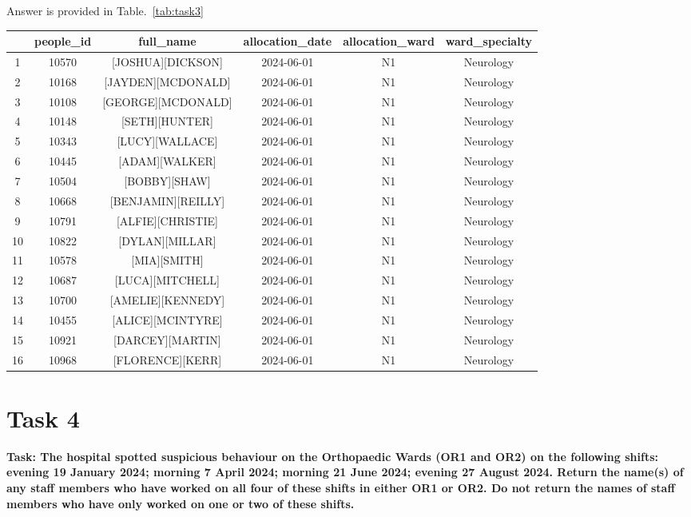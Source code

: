 \documentclass{article}
\begin{document}
Answer is provided in Table.~\ref{tab:task3}

\begin{sidewaystable}[h]
\centering
\small
\begin{tabular}{|c|c|c|c|c|c|}
\hline & people\_id & full\_name & allocation\_date & allocation\_ward & ward\_specialty \\
\hline 1 & 10570 & [JOSHUA][DICKSON] & 2024-06-01 & N1 & Neurology \\
\hline 2 & 10168 & [JAYDEN][MCDONALD] & 2024-06-01 & N1 & Neurology \\
\hline 3 & 10108 & [GEORGE][MCDONALD] & 2024-06-01 & N1 & Neurology \\
\hline 4 & 10148 & [SETH][HUNTER] & 2024-06-01 & N1 & Neurology \\
\hline 5 & 10343 & [LUCY][WALLACE] & 2024-06-01 & N1 & Neurology \\
\hline 6 & 10445 & [ADAM][WALKER] & 2024-06-01 & N1 & Neurology \\
\hline 7 & 10504 & [BOBBY][SHAW] & 2024-06-01 & N1 & Neurology \\
\hline 8 & 10668 & [BENJAMIN][REILLY] & 2024-06-01 & N1 & Neurology \\
\hline 9 & 10791 & [ALFIE][CHRISTIE] & 2024-06-01 & N1 & Neurology \\
\hline 10 & 10822 & [DYLAN][MILLAR] & 2024-06-01 & N1 & Neurology \\
\hline 11 & 10578 & [MIA][SMITH] & 2024-06-01 & N1 & Neurology \\
\hline 12 & 10687 & [LUCA][MITCHELL] & 2024-06-01 & N1 & Neurology \\
\hline 13 & 10700 & [AMELIE][KENNEDY] & 2024-06-01 & N1 & Neurology \\
\hline 14 & 10455 & [ALICE][MCINTYRE] & 2024-06-01 & N1 & Neurology \\
\hline 15 & 10921 & [DARCEY][MARTIN] & 2024-06-01 & N1 & Neurology \\
\hline 16 & 10968 & [FLORENCE][KERR] & 2024-06-01 & N1 & Neurology \\
\hline
\end{tabular}
   \caption{List of staff members who were born in 1957}
    \label{tab:task3}
\end{sidewaystable}

\section{Task 4}
\textbf{Task: The hospital spotted suspicious behaviour on the Orthopaedic Wards (OR1 and OR2)
on the following shifts: evening 19 January 2024; morning 7 April 2024; morning 21
June 2024; evening 27 August 2024. Return the name(s) of any staff members who have
worked on all four of these shifts in either OR1 or OR2. Do not return the names of
staff members who have only worked on one or two of these shifts.}
\end{document}

